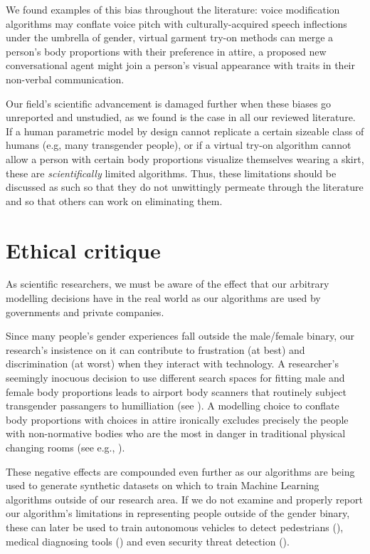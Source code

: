 \documentclass[sigconf,review,balance=false]{acmart}
\begin{document}
We found examples of this bias throughout the literature: voice modification
algorithms may conflate voice pitch with culturally-acquired speech inflections
under the umbrella of gender, virtual garment try-on methods can merge a
person's body proportions with their preference in attire, a proposed new
conversational agent might join a person's visual appearance with traits in
their non-verbal communication.

Our field's scientific advancement is damaged further when these biases go
unreported and unstudied, as we found is the case in all our reviewed
literature. If a human parametric model by design cannot replicate a certain
sizeable class of humans (e.g, many transgender people), or if a virtual try-on
algorithm cannot allow a person with certain body proportions visualize
themselves wearing a skirt, these are \emph{scientifically} limited algorithms.
Thus, these limitations should be discussed as such so that they do not
unwittingly permeate through the literature and so that others can work on
eliminating them.

\section{Ethical critique}

As scientific researchers, we must be aware of the effect that our arbitrary
modelling decisions have in the real world as our algorithms are used by
governments and private companies. 

Since many people's gender experiences fall outside the male/female binary, our
research's insistence on it can contribute to frustration (at best) and
discrimination (at worst) when they interact with technology. A researcher's
seemingly inocuous decision to use different search spaces for fitting male and
female body proportions leads to airport body scanners that routinely subject
transgender passangers to humilliation (see \cite{tsa}). A modelling choice to
conflate body proportions with choices in attire ironically excludes precisely
the people with non-normative bodies who are the most in danger in traditional
physical changing rooms (see e.g., \cite{changingroom}). 


These negative effects are compounded even further as our algorithms are being
used to generate synthetic datasets on which to train Machine Learning
algorithms outside of our research area. If we do not examine and properly
report our algorithm's limitations in representing people outside of the gender
binary, these can later be used to train autonomous vehicles to detect
pedestrians (\cite{cars}), medical diagnosing tools (\cite{chen2021synthetic})
and even security threat detection (\cite{dhs}).
\end{document}
